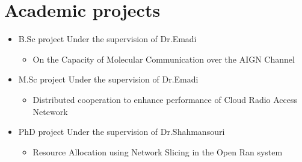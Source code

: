 \documentclass[10pt,a4paper,sans]{moderncv} %
\begin{document}
\section{Academic projects}
\begin{itemize}
\item B.Sc project
Under the supervision of Dr.Emadi 
\begin{itemize}
\item On the Capacity of Molecular Communication over the AIGN Channel

\end{itemize}

\item{M.Sc project}
Under the supervision of Dr.Emadi
\begin{itemize}
\item Distributed cooperation to enhance performance of Cloud Radio Access Netework

\end{itemize}
\item{PhD project}
Under the supervision of Dr.Shahmansouri
\begin{itemize}
\item Resource Allocation using Network Slicing in the Open Ran system
\end{itemize}
\end{itemize}
\end{document}
